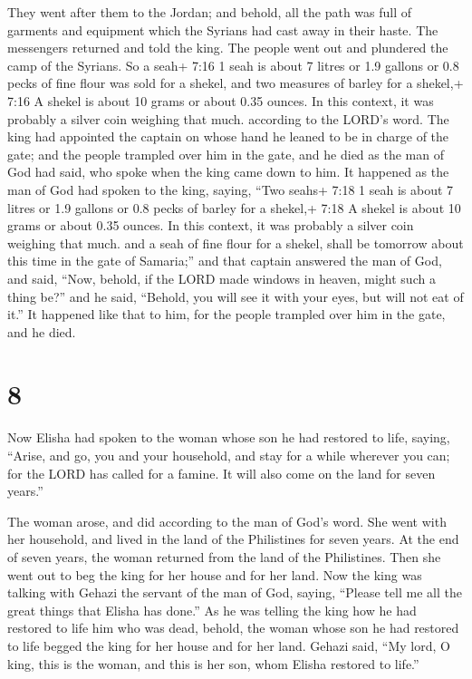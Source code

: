  They went after them to the Jordan; and behold, all the
path was full of garments and equipment which the Syrians had cast away
in their haste. The messengers returned and told the king. 
The people went out and plundered the camp of the Syrians. So a seah+
7:16 1 seah is about 7 litres or 1.9 gallons or 0.8 pecks of fine flour
was sold for a shekel, and two measures of barley for a shekel,+ 7:16 A
shekel is about 10 grams or about 0.35 ounces. In this context, it was
probably a silver coin weighing that much. according to the LORD's word.
 The king had appointed the captain on whose hand he leaned
to be in charge of the gate; and the people trampled over him in the
gate, and he died as the man of God had said, who spoke when the king
came down to him.  It happened as the man of God had spoken
to the king, saying, ``Two seahs+ 7:18 1 seah is about 7 litres or 1.9
gallons or 0.8 pecks of barley for a shekel,+ 7:18 A shekel is about 10
grams or about 0.35 ounces. In this context, it was probably a silver
coin weighing that much. and a seah of fine flour for a shekel, shall be
tomorrow about this time in the gate of Samaria;''  and
that captain answered the man of God, and said, ``Now, behold, if the
LORD made windows in heaven, might such a thing be?'' and he said,
``Behold, you will see it with your eyes, but will not eat of it.''
 It happened like that to him, for the people trampled over
him in the gate, and he died.

\hypertarget{section-7}{%
\section{8}\label{section-7}}

 Now Elisha had spoken to the woman whose son he had
restored to life, saying, ``Arise, and go, you and your household, and
stay for a while wherever you can; for the LORD has called for a famine.
It will also come on the land for seven years.''

 The woman arose, and did according to the man of God's
word. She went with her household, and lived in the land of the
Philistines for seven years.  At the end of seven years, the
woman returned from the land of the Philistines. Then she went out to
beg the king for her house and for her land.  Now the king
was talking with Gehazi the servant of the man of God, saying, ``Please
tell me all the great things that Elisha has done.''  As he
was telling the king how he had restored to life him who was dead,
behold, the woman whose son he had restored to life begged the king for
her house and for her land. Gehazi said, ``My lord, O king, this is the
woman, and this is her son, whom Elisha restored to life.''

